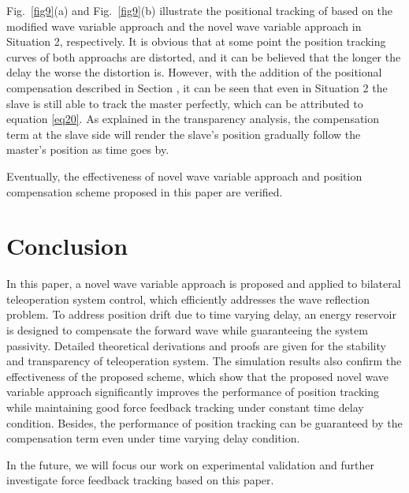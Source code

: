 \par Fig.~\ref{fig9}(a) and Fig.~\ref{fig9}(b) illustrate the positional tracking of based on
the modified wave variable approach and the novel wave variable approach
in Situation 2, respectively.
It is obvious that
at some point the position tracking curves of both approachs are distorted,
and it can be believed that the longer the delay the worse the distortion is.
However, with the addition of the positional compensation described in Section \uppercase\expandafter{} ,
it can be seen that even in Situation 2 the slave is still able to track the master perfectly,
which can be attributed to equation \eqref{eq20}.
As explained in the transparency analysis,
the compensation term at the slave side will render the slave's position
gradually follow the master's position as time goes by.

\par Eventually,
the effectiveness of novel wave variable approach 
and position compensation scheme proposed
in this paper are verified.


\section{Conclusion}
In this paper,
a novel wave variable approach is proposed and applied to bilateral teleoperation system control,
which efficiently addresses the wave reflection problem. 
To address position drift due to time varying delay,
an energy reservoir is designed to compensate the forward wave while guaranteeing the system passivity.
Detailed theoretical derivations 
and proofs are given for the stability and transparency of teleoperation system.
The simulation results also confirm the effectiveness of the proposed scheme,
which show that the proposed novel wave variable approach
significantly improves the performance of position tracking
while maintaining good force feedback tracking under constant time delay condition.
Besides, the performance of position tracking can be guaranteed by the compensation term
even under time varying delay condition.
\par In the future,
we will focus our work 
on experimental validation and 
further investigate force feedback tracking based on this paper.
%  
% 


